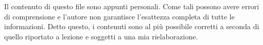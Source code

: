 Il contenuto di questo file sono appunti personali. Come tali possono avere errori di comprensione e l'autore non garantisce l'esattezza completa di tutte le informazioni. Detto questo, i contenuti sono al più possibile corretti a seconda di quello riportato a lezione e soggetti a una mia rielaborazione.
